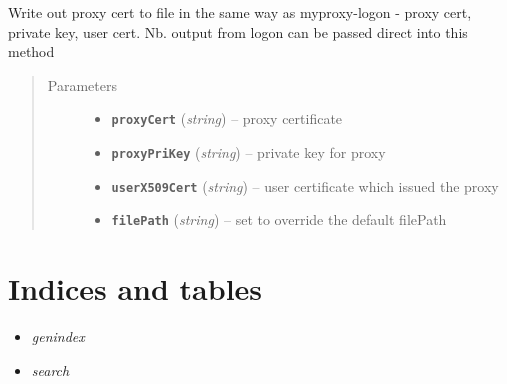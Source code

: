 \documentclass[letterpaper,10pt,english]{sphinxmanual}
\begin{document}
\begin{fulllineitems}
\begin{fulllineitems}
\end{fulllineitems}


\begin{fulllineitems}
\label{client:myproxy.client.MyProxyClient.writeProxyFile}
Write out proxy cert to file in the same way as myproxy-logon - 
proxy cert, private key, user cert.  Nb. output from logon can be
passed direct into this method
\begin{quote}\begin{description}
\item[{Parameters}] \leavevmode\begin{itemize}
\item {} 
\textbf{\texttt{proxyCert}} (\emph{string}) -- proxy certificate

\item {} 
\textbf{\texttt{proxyPriKey}} (\emph{string}) -- private key for proxy

\item {} 
\textbf{\texttt{userX509Cert}} (\emph{string}) -- user certificate which issued the proxy

\item {} 
\textbf{\texttt{filePath}} (\emph{string}) -- set to override the default filePath

\end{itemize}

\end{description}\end{quote}

\end{fulllineitems}


\end{fulllineitems}



\chapter{Indices and tables}
\label{README:indices-and-tables}\begin{itemize}
\item {} 
\emph{genindex}

\item {} 
\emph{search}

\end{itemize}



\renewcommand{\indexname}{Index}
\printindex
\end{document}
